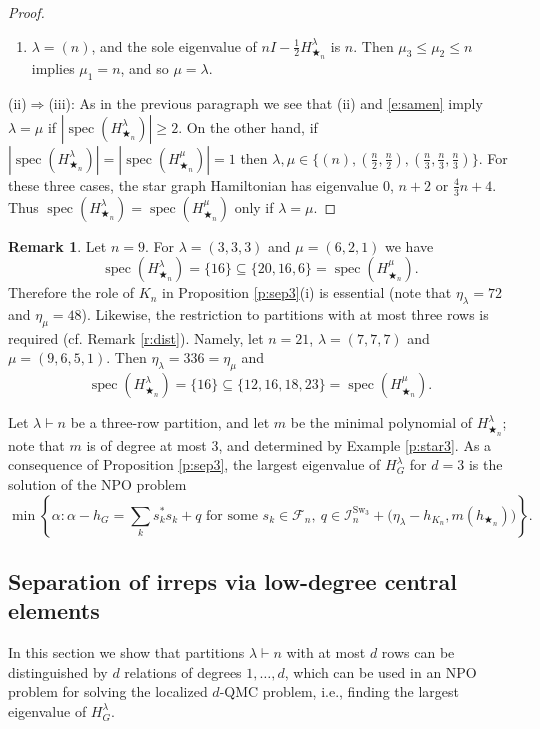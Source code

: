 \documentclass[12pt,dvipsnames,accepted=2016-08-18,a4paper,onecolumn]{quantumarticle}
\def\starn{{\bigstar_{n}}}
\DeclareMathOperator{\spec}{spec}
\numberwithin{equation}{section}
\newcommand{\cF}{\mathcal F}
\theoremstyle{definition}
\newtheorem{remark}[theorem]{Remark}
\begin{document}
\begin{proof}
\begin{enumerate}[\rm(1)]
\item ${\lambda}=(n)$, and the sole eigenvalue of $nI-\frac12 H_{\starn}^{\lambda}$ is $n$. Then ${\mu}_3\le{\mu}_2\le n$ implies ${\mu}_1=n$, and so ${\mu}={\lambda}$.
\end{enumerate}

(ii)$\Rightarrow$(iii): As in the previous paragraph we see that (ii) and \eqref{e:samen} imply ${\lambda}={\mu}$ if $|\spec(H_{\starn}^{\lambda})|\ge2$. 
On the other hand, if $|\spec(H_{\starn}^{\lambda})|=|\spec(H_{\starn}^{\mu})|=1$ then ${\lambda},{\mu}\in\{(n),(\frac{n}{2},\frac{n}{2}),(\frac{n}{3},\frac{n}{3},\frac{n}{3})\}$. For these three cases, the star graph Hamiltonian has eigenvalue $0$, $n+2$ or $\frac43 n+4$. Thus $\spec(H_{\starn}^{\lambda})=\spec(H_{\starn}^{\mu})$ only if ${\lambda}={\mu}$.
\end{proof}

\begin{remark}
Let $n=9$. For ${\lambda}=(3,3,3)$ and ${\mu}=(6,2,1)$ we have
$$\spec(H_{\starn}^{\lambda})
=\{16\}\subseteq\{20,16,6\}=
\spec(H_{\starn}^{\mu}).$$
Therefore the role of $K_n$ in Proposition \ref{p:sep3}(i) is essential (note that $\eta_{\lambda}=72$ and $\eta_{\mu}=48$).
Likewise, the restriction to partitions with at most three rows is required (cf. Remark \ref{r:dist}).
Namely, let $n=21$, ${\lambda}=(7,7,7)$ and $\mu=(9,6,5,1)$. Then $\eta_\lambda=336=\eta_\mu$ and
$$\spec(H_{\starn}^{\lambda})
=\{16\}\subseteq\{12, 16, 18, 23\}=
\spec(H_{\starn}^\mu).$$
\end{remark}

Let $\lambda\vdash n$ be a three-row partition, and let $m$ be the minimal polynomial of $H_{\starn}^\lambda$; note that $m$ is of degree at most 3, and determined by Example \ref{p:star3}.
As a consequence of Proposition \ref{p:sep3}, the largest eigenvalue of $H_G^\lambda$ for $d=3$ is the solution of the NPO problem
$$
\min\left\{
\alpha:\alpha-h_G=\sum_k s_k^*s_k+q  
\text{ for some } 
s_k\in\cF_n,\ q\in \mathcal{I}^{\text{Sw}_3}_n
+\big(\eta_\lambda-h_{K_n},m(h_{\starn})\big)
\right\}.
$$

\subsection{Separation of irreps via low-degree central elements}

In this section we show that partitions $\lambda\vdash n$ with at most $d$ rows can be distinguished by $d$ relations of degrees $1,\dots,d$, which can be used in an NPO problem for solving the localized $d$-QMC problem, i.e., finding the largest eigenvalue of $H_G^\lambda$.
\end{document}
